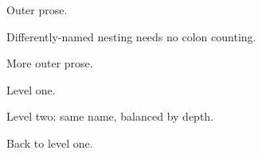 \begin{outerblock}
Outer prose.

\begin{innerblock}
Differently-named nesting needs no colon counting.
\end{innerblock}

More outer prose.
\end{outerblock}

\begin{panel}
Level one.

\begin{panel}
Level two: same name, balanced by depth.
\end{panel}

Back to level one.
\end{panel}

